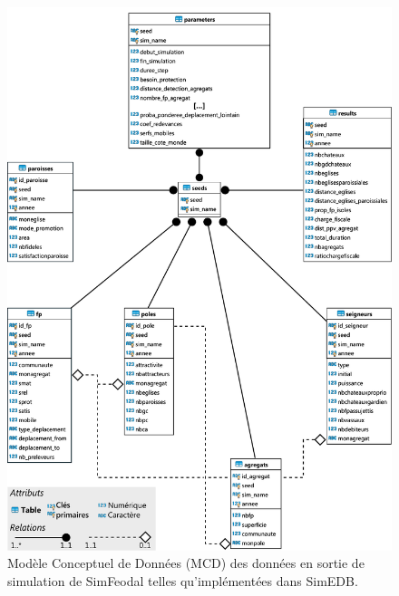 \clearpage			
		\begin{figure}[H]
			\centering
			\captionsetup{width=\linewidth}
			\includegraphics[width=\linewidth]{img/MCD_SimEDB_repris.pdf}
			\caption{Modèle Conceptuel de Données (MCD) des données en sortie de simulation de SimFeodal telles qu'implémentées dans SimEDB.}
			\label{fig:MCD_SimEDB}
		\end{figure}
\clearpage	
			
